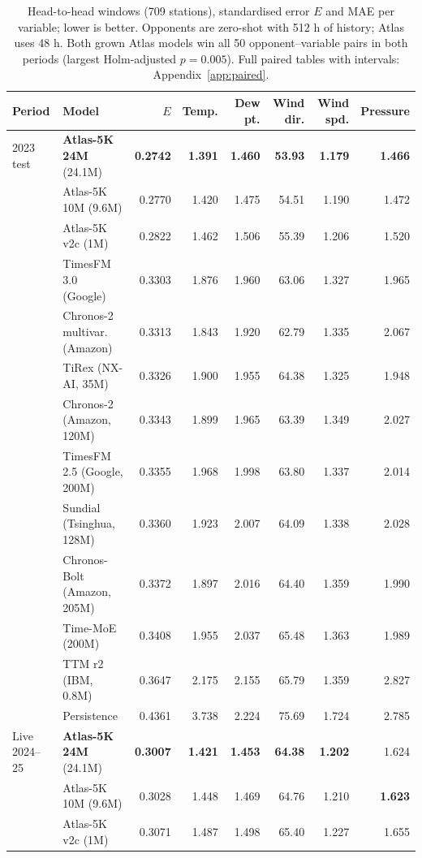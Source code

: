 \documentclass{article}
\begin{document}
\begin{table}[t]
\caption{Head-to-head windows (709 stations), standardised error $E$ and MAE per variable; lower is better. Opponents
are zero-shot with 512 h of history; Atlas uses 48 h. Both grown Atlas models win all 50 opponent--variable pairs in
both periods (largest Holm-adjusted $p=0.005$). Full paired tables with intervals: Appendix~\ref{app:paired}.}
\label{tab:h2h}
\centering\footnotesize
\setlength{\tabcolsep}{3.6pt}
\begin{tabular}{llrrrrrr}
\toprule
Period & Model & $E$ & Temp. & Dew pt. & Wind dir. & Wind spd. & Pressure\\
\midrule
 2023 test & \textbf{Atlas-5K 24M} (24.1M) & \textbf{0.2742} & \textbf{1.391} & \textbf{1.460} & \textbf{53.93} & \textbf{1.179} & \textbf{1.466}\\
  & Atlas-5K 10M (9.6M) & 0.2770 & 1.420 & 1.475 & 54.51 & 1.190 & 1.472\\
  & Atlas-5K v2c (1M) & 0.2822 & 1.462 & 1.506 & 55.39 & 1.206 & 1.520\\
  & TimesFM 3.0 (Google) & 0.3303 & 1.876 & 1.960 & 63.06 & 1.327 & 1.965\\
  & Chronos-2 multivar. (Amazon) & 0.3313 & 1.843 & 1.920 & 62.79 & 1.335 & 2.067\\
  & TiRex (NX-AI, 35M) & 0.3326 & 1.900 & 1.955 & 64.38 & 1.325 & 1.948\\
  & Chronos-2 (Amazon, 120M) & 0.3343 & 1.899 & 1.965 & 63.39 & 1.349 & 2.027\\
  & TimesFM 2.5 (Google, 200M) & 0.3355 & 1.968 & 1.998 & 63.80 & 1.337 & 2.014\\
  & Sundial (Tsinghua, 128M) & 0.3360 & 1.923 & 2.007 & 64.09 & 1.338 & 2.028\\
  & Chronos-Bolt (Amazon, 205M) & 0.3372 & 1.897 & 2.016 & 64.40 & 1.359 & 1.990\\
  & Time-MoE (200M) & 0.3408 & 1.955 & 2.037 & 65.48 & 1.363 & 1.989\\
  & TTM r2 (IBM, 0.8M) & 0.3647 & 2.175 & 2.155 & 65.79 & 1.359 & 2.827\\
  & Persistence & 0.4361 & 3.738 & 2.224 & 75.69 & 1.724 & 2.785\\
\midrule
 Live 2024--25 & \textbf{Atlas-5K 24M} (24.1M) & \textbf{0.3007} & \textbf{1.421} & \textbf{1.453} & \textbf{64.38} & \textbf{1.202} & 1.624\\
  & Atlas-5K 10M (9.6M) & 0.3028 & 1.448 & 1.469 & 64.76 & 1.210 & \textbf{1.623}\\
  & Atlas-5K v2c (1M) & 0.3071 & 1.487 & 1.498 & 65.40 & 1.227 & 1.655\\

\end{tabular}
\end{table}
\end{document}
